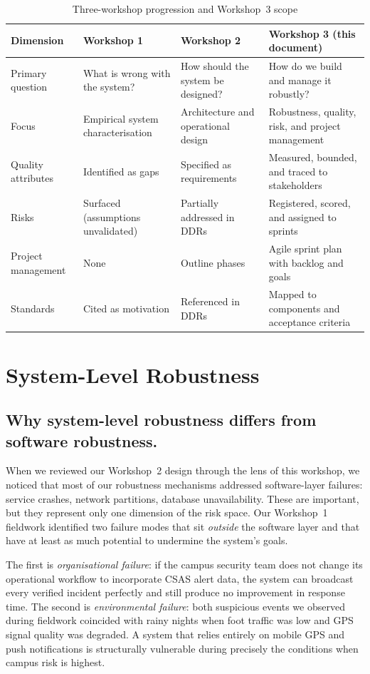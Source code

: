 \documentclass[12pt,a4paper]{article}
\begin{document}
\begin{table}[h]
\caption{Three-workshop progression and Workshop~3 scope}
\label{tab:w3scope}
\centering
\begin{tabularx}{\textwidth}{lXXX}
\toprule
\textbf{Dimension} & \textbf{Workshop 1} & \textbf{Workshop 2} & \textbf{Workshop 3 (this document)} \\
\midrule
Primary question & What is wrong with the system? & How should the system be designed? & How do we build and manage it robustly? \\
Focus & Empirical system characterisation & Architecture and operational design & Robustness, quality, risk, and project management \\
Quality attributes & Identified as gaps & Specified as requirements & Measured, bounded, and traced to stakeholders \\
Risks & Surfaced (assumptions unvalidated) & Partially addressed in DDRs & Registered, scored, and assigned to sprints \\
Project management & None & Outline phases & Agile sprint plan with backlog and goals \\
Standards & Cited as motivation & Referenced in DDRs & Mapped to components and acceptance criteria \\
\bottomrule
\end{tabularx}
\end{table}

\section{System-Level Robustness}
\label{sec:robustness}

\subsection{Why system-level robustness differs from software robustness.}
When we reviewed our Workshop~2 design through the lens of this
workshop, we noticed that most of our robustness mechanisms addressed
software-layer failures: service crashes, network partitions,
database unavailability. These are important, but they represent
only one dimension of the risk space. Our Workshop~1 fieldwork
identified two failure modes that sit \emph{outside} the software
layer and that have at least as much potential to undermine the
system's goals.

The first is \emph{organisational failure}: if the campus security
team does not change its operational workflow to incorporate CSAS
alert data, the system can broadcast every verified incident
perfectly and still produce no improvement in response time.
The second is \emph{environmental failure}: both suspicious events
we observed during fieldwork coincided with rainy nights when foot
traffic was low and GPS signal quality was degraded. A system that
relies entirely on mobile GPS and push notifications is structurally
vulnerable during precisely the conditions when campus risk is
highest.
\end{document}
